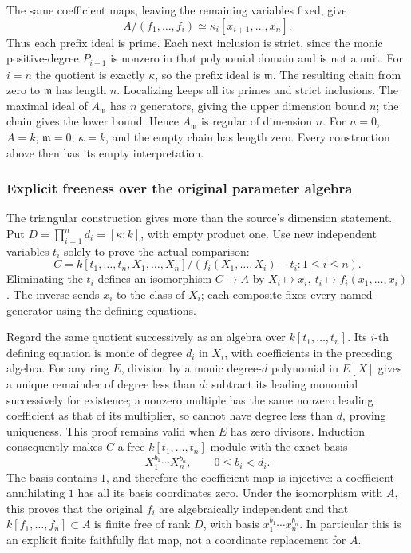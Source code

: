 The same coefficient maps, leaving the remaining variables fixed, give \[
 A/(f_1,\ldots,f_i)\simeq
 \kappa_i[x_{i+1},\ldots,x_n].
\] Thus each prefix ideal is prime. Each next inclusion is strict, since the monic positive-degree \(P_{i+1}\) is nonzero in that polynomial domain and is not a unit. For \(i=n\) the quotient is exactly \(\kappa\), so the prefix ideal is \(\mathfrak m\). The resulting chain from zero to \(\mathfrak m\) has length \(n\). Localizing keeps all its primes and strict inclusions. The maximal ideal of \(A_{\mathfrak m}\) has \(n\) generators, giving the upper dimension bound \(n\); the chain gives the lower bound. Hence \(A_{\mathfrak m}\) is regular of dimension \(n\). For \(n=0\), \(A=k\), \(\mathfrak m=0\), \(\kappa=k\), and the empty chain has length zero. Every construction above then has its empty interpretation.

\subsubsection{Explicit freeness over the original parameter algebra}\label{explicit-freeness-over-the-original-parameter-algebra}

The triangular construction gives more than the source's dimension statement. Put \(D=\prod_{i=1}^n d_i=[\kappa:k]\), with empty product one. Use new independent variables \(t_i\) solely to prove the actual comparison: \[
 C=k[t_1,\ldots,t_n,X_1,\ldots,X_n]/
       (f_i(X_1,\ldots,X_i)-t_i:1\leq i\leq n).
\] Eliminating the \(t_i\) defines an isomorphism \(C\to A\) by \(X_i\mapsto x_i,\ t_i\mapsto f_i(x_1,\ldots,x_i)\). The inverse sends \(x_i\) to the class of \(X_i\); each composite fixes every named generator using the defining equations.

Regard the same quotient successively as an algebra over \(k[t_1,\ldots,t_n]\). Its \(i\)-th defining equation is monic of degree \(d_i\) in \(X_i\), with coefficients in the preceding algebra. For any ring \(E\), division by a monic degree-\(d\) polynomial in \(E[X]\) gives a unique remainder of degree less than \(d\): subtract its leading monomial successively for existence; a nonzero multiple has the same nonzero leading coefficient as that of its multiplier, so cannot have degree less than \(d\), proving uniqueness. This proof remains valid when \(E\) has zero divisors. Induction consequently makes \(C\) a free \(k[t_1,\ldots,t_n]\)-module with the exact basis \[
 X_1^{b_1}\cdots X_n^{b_n},\qquad 0\leq b_i<d_i.
\] The basis contains \(1\), and therefore the coefficient map is injective: a coefficient annihilating \(1\) has all its basis coordinates zero. Under the isomorphism with \(A\), this proves that the original \(f_i\) are algebraically independent and that \(k[f_1,\ldots,f_n]\subset A\) is finite free of rank \(D\), with basis \(x_1^{b_1}\cdots x_n^{b_n}\). In particular this is an explicit finite faithfully flat map, not a coordinate replacement for \(A\).

